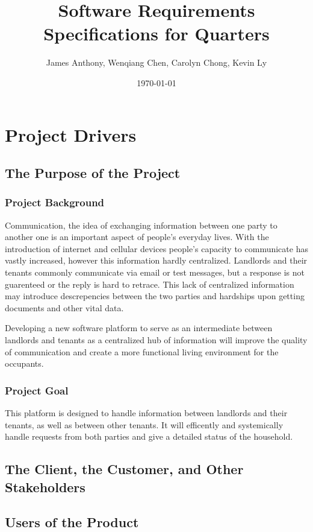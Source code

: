 \documentclass[12pt]{article}
\begin{document}
\title{Software Requirements Specifications for Quarters} 
\author{James Anthony, Wenqiang Chen, Carolyn Chong, Kevin Ly}
\date{\today}
\maketitle

\pagebreak
\tableofcontents 

\pagebreak
\section{Project Drivers}
\subsection{The Purpose of the Project}
\subsubsection{Project Background}
Communication, the idea of exchanging information between one party to another one is an important aspect of people's everyday lives. With the introduction of internet and cellular devices people's capacity to communicate has vastly increased, however this information hardly centralized. Landlords and their tenants commonly communicate via email or test messages, but a response is not guarenteed or the reply is hard to retrace.
This lack of centralized information may introduce descrepencies between the two parties and hardships upon getting documents and other vital data.

Developing a new software platform to serve as an intermediate between 
landlords and tenants  as a centralized hub of information will improve the quality of communication 
and create a more functional living environment for the occupants.

\subsubsection{Project Goal}
This platform is designed to handle information between landlords and their tenants, as well as between other tenants. It will efficently and systemically handle requests from both parties and give a detailed status of the household.

\subsection{The Client, the Customer, and Other Stakeholders}
\subsection{Users of the Product}
\end{document}
